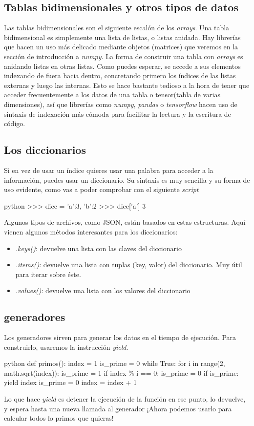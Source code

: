 \documentclass{article}
\begin{document}
\subsection{Tablas bidimensionales y otros tipos de datos}
Las tablas bidimensionales son el siguiente escalón de los \textit{arrays}. Una tabla bidimensional es simplemente una lista de listas, o listas anidada. Hay librerías que hacen un uso más delicado mediante objetos (matrices) que veremos en la sección de introducción a \textit{numpy}. La forma de construir una tabla con \textit{arrays} es anidando listas en otras listas. Como puedes esperar, se accede a sus elementos indexando de fuera hacia dentro, concretando primero los índices de las listas externas y luego las internas. Esto se hace bastante tedioso a la hora de tener que acceder frecuentemente a los datos de una tabla o tensor(tabla de varias dimensiones), así que librerías como \textit{numpy}, \textit{pandas} o \textit{tensorflow} hacen uso de sintaxis de indexación más cómoda para facilitar la lectura y la escritura de código. 
\subsection{Los diccionarios}
Si en vez de usar un índice quieres usar una palabra para acceder a la información, puedes usar un diccionario. Su sintaxis es muy sencilla y su forma de uso evidente, como vas a poder comprobar con el siguiente \textit{script}
\begin{mintedbox}{python}
>>> dicc = {'a':3, 'b':2}
>>> dicc['a']
3

\end{mintedbox}
Algunos tipos de archivos, como JSON, están basados en estas estructuras. Aquí vienen algunos métodos interesantes para los diccionarios:
\begin{itemize}
    \item \textit{.keys()}: devuelve una lista con las claves del diccionario
    \item \textit{.items()}: devuelve una lista con tuplas (key, valor) del diccionario. Muy útil para iterar sobre éste.
    \item \textit{.values()}: devuelve una lista con los valores del diccionario
\end{itemize}
\subsection{generadores}
Los generadores sirven para generar los datos en el tiempo de ejecución. Para construirlo, usaremos la instrucción \textit{yield}.
\begin{mintedbox}{python}
def primos():
    index = 1
    is_prime = 0
    while True:
        for i in range(2, math.sqrt(index)):
            is_prime = 1
            if index \% i == 0:
                is_prime = 0
        if is_prime:
            yield index
            is_prime = 0
        index = index + 1
\end{mintedbox}
Lo que hace \textit{yield} es detener la ejecución de la función en ese punto, lo devuelve, y espera hasta una nueva llamada al generador ¡Ahora podemos usarlo para calcular todos lo primos que quieras!
\end{document}
